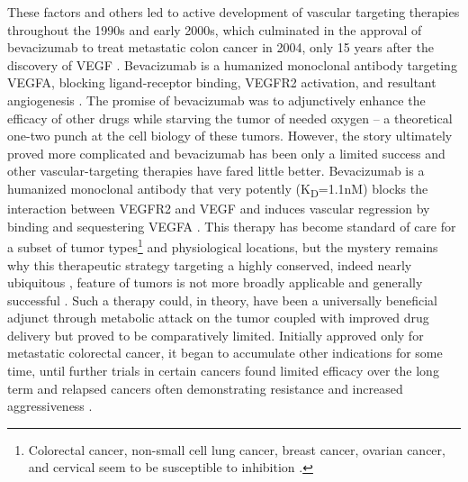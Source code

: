 These factors and others led to active development of vascular targeting therapies throughout the 1990s and early 2000s, which culminated in the approval of bevacizumab to treat metastatic colon cancer in 2004, only 15 years after the discovery of VEGF \citep{Ferrara2004, Leung1989, Gordon2005b, McCormack2008, Kabbinavar2005, Muhsin2004}. Bevacizumab is a humanized monoclonal antibody targeting VEGFA, blocking ligand\hyp{}receptor binding, VEGFR2 activation, and resultant angiogenesis \citep{Keating2014}. The promise of bevacizumab was to adjunctively enhance the efficacy of other drugs while starving the tumor of needed oxygen -- a theoretical one\hyp{}two punch at the cell biology of these tumors. However, the story ultimately proved more complicated and bevacizumab has been only a limited success and other vascular\hyp{}targeting therapies have fared little better. Bevacizumab is a humanized monoclonal antibody that very potently (K\textsubscript{D}=1.1nM) blocks the interaction between VEGFR2 and VEGF and induces vascular regression by binding and sequestering VEGFA \citep{Papadopoulos2012, Yang2014a}. This therapy has become standard of care for a subset of tumor types\footnote{Colorectal cancer, non\hyp{}small cell lung cancer, breast cancer, ovarian cancer, and cervical seem to be susceptible to inhibition \citep{KazaziHyseni2010, Garcia2013, Baraniskin2019, Botrel2016, Gridelli2018, Tewari2014}.} and physiological locations, but the mystery remains why this therapeutic strategy targeting a highly conserved, indeed nearly ubiquitous \citep{Donnem2018}, feature of tumors is not more broadly applicable and generally successful \citep{VanMeter2010}. Such a therapy could, in theory, have been a universally beneficial adjunct through metabolic attack on the tumor coupled with improved drug delivery but proved to be comparatively limited. Initially approved only for metastatic colorectal cancer, it began to accumulate other indications for some time, until further trials in certain cancers found limited efficacy over the long term and relapsed cancers often demonstrating resistance and increased aggressiveness \citep{Itatani2018, Rivera2015}. 

